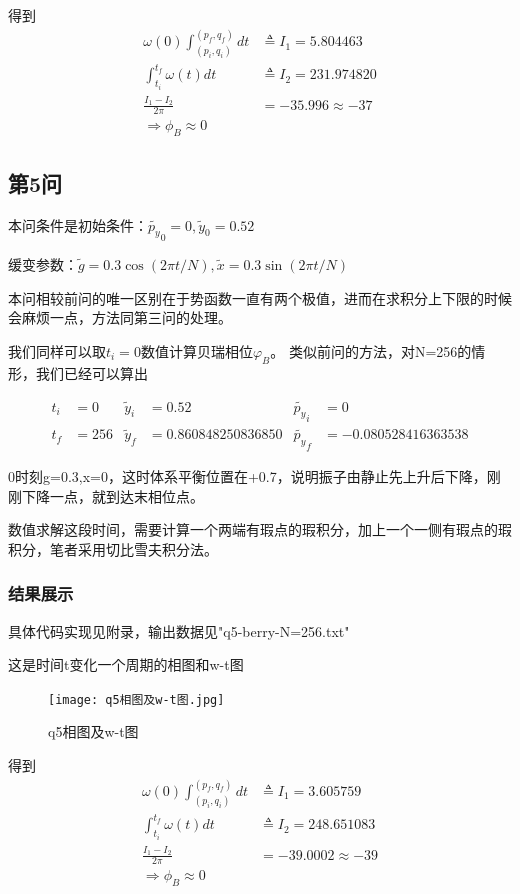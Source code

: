 \documentclass[10pt, a4paper]{article}
\newcommand{\wx}{\widetilde{x}}
\newcommand{\wy}{\widetilde{y}}
\newcommand{\wg}{\widetilde{g}}
\newcommand{\wpy}{\widetilde{p_y}}
\begin{document}
    得到
    \begin{align}
        \omega(0)\int_{(p_i,q_i)}^{(p_f,q_f)}dt&\triangleq I_1=5.804463\\
        \int_{t_i}^{t_f}\omega(t)dt&\triangleq I_2=231.974820\\
        \frac{I_1-I_2}{2\pi}&=-35.996\approx-37\\
        \Longrightarrow \phi_B\approx0
    \end{align}

    \subsection{第5问}

    本问条件是初始条件：$\wpy_0=0,\wy_0=0.52$

    缓变参数：$\wg=0.3\cos(2\pi t/N),\wx=0.3\sin(2\pi t/N)$

    本问相较前问的唯一区别在于势函数一直有两个极值，进而在求积分上下限的时候会麻烦一点，方法同第三问的处理。

    我们同样可以取$t_i=0$数值计算贝瑞相位$\varphi_B$。
    类似前问的方法，对N=256的情形，我们已经可以算出

    \begin{align}
        t_i&=0& \wy_i&=0.52 & \wpy_i&=0\\  
        t_f&=256& \wy_f&=0.860848250836850& \wpy_f&=-0.080528416363538
    \end{align}

    0时刻g=0.3,x=0，这时体系平衡位置在+0.7，说明振子由静止先上升后下降，刚刚下降一点，就到达末相位点。

    数值求解这段时间，需要计算一个两端有瑕点的瑕积分，加上一个一侧有瑕点的瑕积分，笔者采用切比雪夫积分法。

    \subsubsection{结果展示}

    具体代码实现见附录，输出数据见"q5-berry-N=256.txt"

    这是时间t变化一个周期的相图和w-t图

    \begin{figure}[H]
        \centering
        \texttt{[image: q5相图及w-t图.jpg]}
        \caption{q5相图及w-t图}\label{q5相图及w-t图}
    \end{figure}

    得到
    \begin{align}
        \omega(0)\int_{(p_i,q_i)}^{(p_f,q_f)}dt&\triangleq I_1=3.605759 \\
        \int_{t_i}^{t_f}\omega(t)dt&\triangleq I_2=248.651083\\
        \frac{I_1-I_2}{2\pi}&=-39.0002\approx-39\\
        \Longrightarrow \phi_B\approx0
    \end{align}
\end{document}
